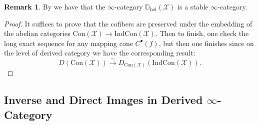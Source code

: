 \documentclass[11pt]{book}
\theoremstyle{definition}
\newtheorem{remark}[theorem]{Remark}
\numberwithin{equation}{section}
\begin{document}
\begin{remark}
By \cite[Section 1.3]{Lurie2} we have that the $\infty$-category $\mathbb{D}_\mathrm{hol}(\mathcal{X})$ is a stable $\infty$-category.	
\end{remark}


\begin{proof}
It suffices to prove that the cofibers are preserved under the embedding of the abelian categories $\mathrm{Con}(\mathcal{X})\rightarrow \mathrm{Ind}\mathrm{Con}(\mathcal{X})$. Then to finish, one check the long exact sequence for any mapping cone $C^\bullet(f)$, but then one finishes since on the level of derived category we have the corresponding result:
\begin{displaymath}
D(\mathrm{Con}(\mathcal{X}))\overset{\sim}{\rightarrow}D_{\mathrm{Con}(\mathcal{X})}(\mathrm{Ind}\mathrm{Con}(\mathcal{X})).
\end{displaymath}	
\end{proof}



\newpage
\subsection{Inverse and Direct Images in Derived $\infty$-Category}
\end{document}
